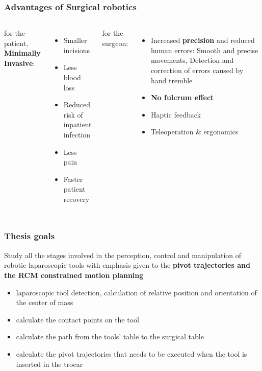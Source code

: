 \begin{frame}
\frametitle{Advantages of Surgical robotics}
\begin{columns}[t]
for the patient, \textbf{Minimally Invasive}:
\begin{itemize}
\item Smaller incisions
\item Less blood loss
\item Reduced risk of inpatient infection
\item Less pain
\item Faster patient recovery
\end{itemize}

for the surgeon:
\begin{itemize}
\item Increased \textbf{precision} and reduced human errors: Smooth and precise movements, Detection and correction of errors caused by hand tremble
\item \textbf{No fulcrum effect}
\item Haptic feedback
\item Teleoperation \& ergonomics
\end{itemize}
\end{columns}
\end{frame}

\begin{frame}
\frametitle{Thesis goals}
Study all the stages involved in the perception, control and manipulation of robotic laparoscopic tools with emphasis given to the \textbf{pivot trajectories and the RCM constrained motion planning}
\begin{itemize}
\item laparoscopic tool detection, calculation of relative position and orientation of the center of mass
\item calculate the contact points on the tool
\item calculate the path from the tools’ table to the surgical table
\item calculate the pivot trajectories that needs to be executed when the tool is inserted in the trocar
\end{itemize}
\end{frame}